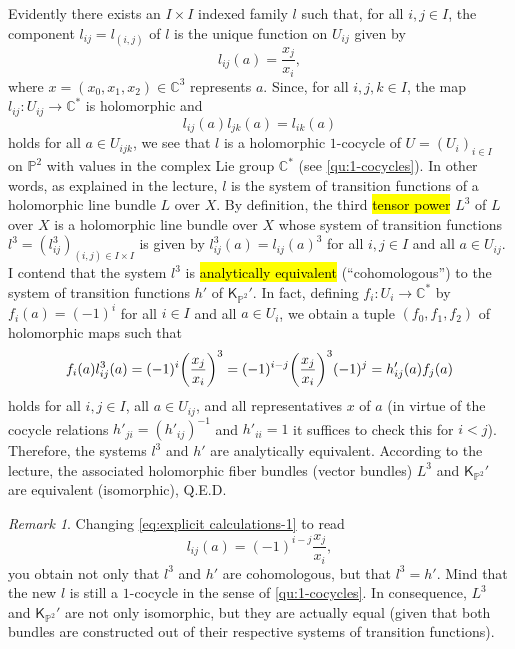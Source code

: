 \documentclass[a4paper]{amsart}
\newcommand{\C}{\mathbb{C}}
\newcommand{\KB}[1]{\mathsf{K}_{#1}}
\renewcommand{\P}{\mathbb{P}}
\theoremstyle{remark}
\newtheorem{remark}{Remark}[question]
\numberwithin{equation}{question}
\DeclarePairedDelimiter\paren{(}{)}
\begin{document}
\begin{solution}
\begin{solenum}
\item Evidently there exists an $I \times I$ indexed family $l$ such that, for all $i,j \in I$, the component $l_{ij} = l_{(i,j)}$ of $l$ is the unique function on $U_{ij}$ given by
\begin{equation}
\label{eq:explicit calculations-1}
l_{ij}(a) = \frac{x_j}{x_i},
\end{equation}
where $x = (x_0,x_1,x_2) \in \C^3$ represents $a$. Since, for all $i,j,k \in I$, the map $l_{ij} \colon U_{ij} \to \C^*$ is holomorphic and
\[
l_{ij}(a)l_{jk}(a) = l_{ik}(a)
\]
holds for all $a \in U_{ijk}$, we see that $l$ is a holomorphic $1$-cocycle of $U = (U_i)_{i \in I}$ on $\P^2$ with values in the complex Lie group $\C^*$ (see \cref{qu:1-cocycles}). In other words, as explained in the lecture, $l$ is the system of transition functions of a holomorphic line bundle $L$ over $X$. By definition, the third \hl{tensor power} $L^3$ of $L$ over $X$ is a holomorphic line bundle over $X$ whose system of transition functions $l^3 = (l^3_{ij})_{(i,j) \in I\times I}$ is given by $l^3_{ij}(a) = l_{ij}(a)^3$ for all $i,j \in I$ and all $a \in U_{ij}$. I contend that the system $l^3$ is \hl{analytically equivalent} (“cohomologous”) to the system of transition functions $h'$ of $\KB{\P^2}'$. In fact, defining $f_i \colon U_i \to \C^*$ by $f_i(a) = (-1)^i$ for all $i \in I$ and all $a \in U_i$, we obtain a tuple $(f_0,f_1,f_2)$ of holomorphic maps such that
\[
f_i(a)l^3_{ij}(a) = (-1)^i\paren*{\frac{x_j}{x_i}}^3 = (-1)^{i-j}\paren*{\frac{x_j}{x_i}}^3(-1)^j = h'_{ij}(a)f_j(a)
\]
holds for all $i,j \in I$, all $a \in U_{ij}$, and all representatives $x$ of $a$ (in virtue of the cocycle relations $h'_{ji} = (h'_{ij})^{-1}$ and $h'_{ii} = 1$ it suffices to check this for $i<j$). Therefore, the systems $l^3$ and $h'$ are analytically equivalent. According to the lecture, the associated holomorphic fiber bundles (vector bundles) $L^3$ and $\KB{\P^2}'$ are equivalent (isomorphic), Q.E.D.

\begin{remark}
\label{re:explicit calculations}
Changing \cref{eq:explicit calculations-1} to read
\[
l_{ij}(a) = (-1)^{i-j}\frac{x_j}{x_i},
\]
you obtain not only that $l^3$ and $h'$ are cohomologous, but that $l^3 = h'$. Mind that the new $l$ is still a $1$-cocycle in the sense of \cref{qu:1-cocycles}. In consequence, $L^3$ and $\KB{\P^2}'$ are not only isomorphic, but they are actually equal (given that both bundles are constructed out of their respective systems of transition functions).
\end{remark}


\end{solenum}
\end{solution}
\end{document}
